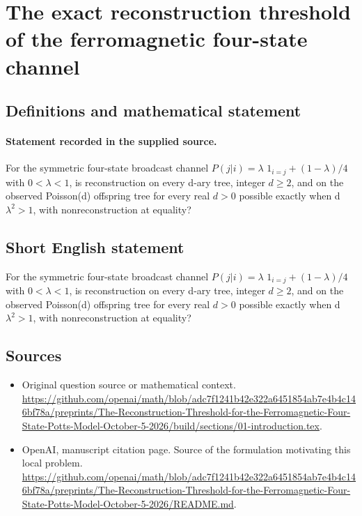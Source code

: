 \documentclass[11pt]{article}
\begin{document}
\section*{The exact reconstruction threshold of the ferromagnetic four-state channel}\label{statement}
\subsection{Definitions and mathematical statement}
\paragraph{Statement recorded in the supplied source.}
For the symmetric four-state broadcast channel $P(j|i)=\lambda $ $1_{i=j}+(1-\lambda )/4$ with $0<\lambda <1$, is reconstruction on every d-ary tree, integer $d\geq 2$, and on the observed Poisson(d) offspring tree for every real $d>0$ possible exactly when d $\lambda ^2>1$, with nonreconstruction at equality?
\subsection{Short English statement}
For the symmetric four-state broadcast channel $P(j|i)=\lambda $ $1_{i=j}+(1-\lambda )/4$ with $0<\lambda <1$, is reconstruction on every d-ary tree, integer $d\geq 2$, and on the observed Poisson(d) offspring tree for every real $d>0$ possible exactly when d $\lambda ^2>1$, with nonreconstruction at equality?
\subsection{Sources}
\begin{itemize}
\item[S1] Original question source or mathematical context.
\url{https://github.com/openai/math/blob/adc7f1241b42e322a6451854ab7e4b4c146bf78a/preprints/The-Reconstruction-Threshold-for-the-Ferromagnetic-Four-State-Potts-Model-October-5-2026/build/sections/01-introduction.tex}.
\item[S2] OpenAI, manuscript citation page. Source of the formulation motivating this local problem.
\url{https://github.com/openai/math/blob/adc7f1241b42e322a6451854ab7e4b4c146bf78a/preprints/The-Reconstruction-Threshold-for-the-Ferromagnetic-Four-State-Potts-Model-October-5-2026/README.md}.
\end{itemize}
\end{document}
